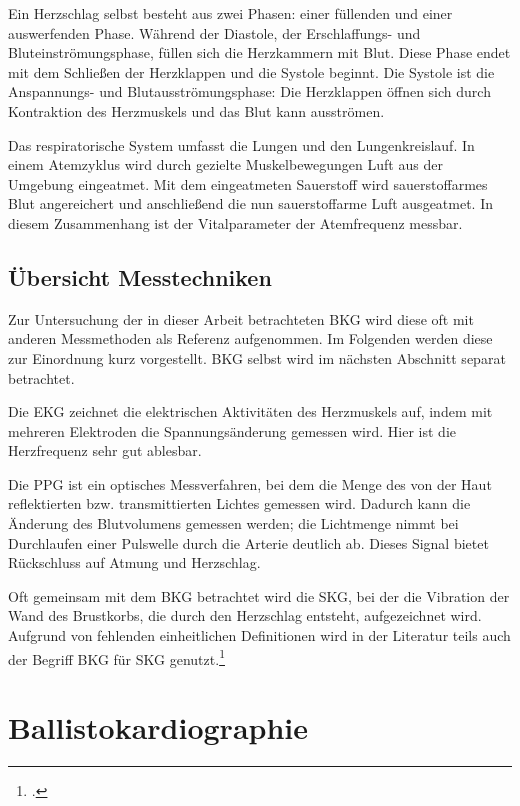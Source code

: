	Ein Herzschlag selbst besteht aus zwei Phasen: einer füllenden und einer auswerfenden Phase. Während der Diastole, der Erschlaffungs- und Bluteinströmungsphase, füllen sich die Herzkammern mit Blut. Diese Phase endet mit dem Schließen der Herzklappen und die Systole beginnt. Die Systole ist die Anspannungs- und Blutausströmungsphase: Die Herzklappen öffnen sich durch Kontraktion des Herzmuskels und das Blut kann ausströmen.
	
	Das respiratorische System umfasst die Lungen und den Lungenkreislauf. In einem Atemzyklus wird durch gezielte Muskelbewegungen Luft aus der Umgebung eingeatmet. Mit dem eingeatmeten Sauerstoff wird sauerstoffarmes Blut angereichert und anschließend die nun sauerstoffarme Luft ausgeatmet. In diesem Zusammenhang ist der Vitalparameter der Atemfrequenz messbar.

	\subsection{Übersicht Messtechniken}
	
	Zur Untersuchung der in dieser Arbeit betrachteten \acf{BKG} wird diese oft mit anderen Messmethoden als Referenz aufgenommen. Im Folgenden werden diese zur Einordnung kurz vorgestellt. \ac{BKG} selbst wird im nächsten Abschnitt separat betrachtet.
	
	Die \acf{EKG} zeichnet die elektrischen Aktivitäten des Herzmuskels auf, indem mit mehreren Elektroden die Spannungsänderung gemessen wird. Hier ist die Herzfrequenz sehr gut ablesbar.
	
	Die \acf{PPG} ist ein optisches Messverfahren, bei dem die Menge des von der Haut reflektierten bzw. transmittierten Lichtes gemessen wird. Dadurch kann die Änderung des Blutvolumens gemessen werden; die Lichtmenge nimmt bei Durchlaufen einer Pulswelle durch die Arterie deutlich ab. Dieses Signal bietet Rückschluss auf Atmung und Herzschlag. %
	
	Oft gemeinsam mit dem \ac{BKG} betrachtet wird die \acf{SKG}, bei der die Vibration der Wand des Brustkorbs, die durch den Herzschlag entsteht, aufgezeichnet wird. Aufgrund von fehlenden einheitlichen Definitionen wird in der Literatur teils auch der Begriff \ac{BKG} für \ac{SKG} genutzt.\footcite{Inan2015}

	\section{Ballistokardiographie}\label{ballistokardiographie}
	
